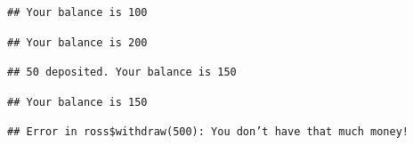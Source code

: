 \documentclass[10pt,]{krantz}
\makeatletter
\newenvironment{Shaded}{\begin{snugshade}}{\end{snugshade}}
\newcommand{\KeywordTok}[1]{\textcolor[rgb]{0.13,0.29,0.53}{\textbf{#1}}}
\newcommand{\DecValTok}[1]{\textcolor[rgb]{0.00,0.00,0.81}{#1}}
\newcommand{\StringTok}[1]{\textcolor[rgb]{0.31,0.60,0.02}{#1}}
\newcommand{\CommentTok}[1]{\textcolor[rgb]{0.56,0.35,0.01}{\textit{#1}}}
\newcommand{\OperatorTok}[1]{\textcolor[rgb]{0.81,0.36,0.00}{\textbf{#1}}}
\newcommand{\NormalTok}[1]{#1}
\newenvironment{kframe}{%
\medskip{}
\setlength{\fboxsep}{.8em}
 \def\at@end@of@kframe{}%
 \ifinner\ifhmode%
  \def\at@end@of@kframe{\end{minipage}}%
  \begin{minipage}{\columnwidth}%
 \fi\fi%
 \def\FrameCommand##1{\hskip\@totalleftmargin \hskip-\fboxsep
 \colorbox{shadecolor}{##1}\hskip-\fboxsep
     \hskip-\linewidth \hskip-\@totalleftmargin \hskip\columnwidth}%
 \MakeFramed {\advance\hsize-\width
   \@totalleftmargin\z@ \linewidth\hsize
   \@setminipage}}%
 {\par\unskip\endMakeFramed%
 \at@end@of@kframe}
\renewenvironment{Shaded}{\begin{kframe}}{\end{kframe}}
\makeatother
\begin{document}
\begin{verbatim}
## Your balance is 100
\end{verbatim}

\begin{Shaded}
\end{Shaded}

\begin{verbatim}
## Your balance is 200
\end{verbatim}

\begin{Shaded}
\end{Shaded}

\begin{verbatim}
## 50 deposited. Your balance is 150
\end{verbatim}

\begin{Shaded}
\end{Shaded}

\begin{verbatim}
## Your balance is 150
\end{verbatim}

\begin{Shaded}
\end{Shaded}

\begin{verbatim}
## Error in ross$withdraw(500): You don’t have that much money!
\end{verbatim}

\begin{Shaded}
\end{Shaded}
\end{document}
